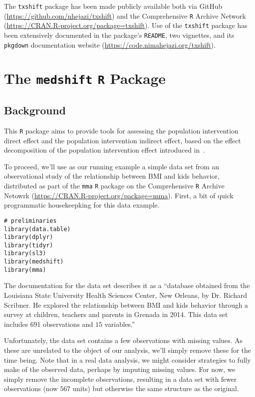 The \texttt{txshift} package has been made publicly available both via
GitHub (\url{https://github.com/nhejazi/txshift}) and the Comprehensive
\texttt{R} Archive Network (\url{https://CRAN.R-project.org/package=txshift}).
Use of the \texttt{txshift} package has been extensively documented in the
package's \texttt{README}, two vignettes, and its \texttt{pkgdown} documentation
website (\url{https://code.nimahejazi.org/txshift}).

\section{The \texttt{medshift} \texttt{R} Package}

\subsection{Background}

This \texttt{R} package aims to provide tools for assessing the population
intervention direct effect and the population intervention indirect effect,
based on the effect decomposition of the population intervention effect
introduced in~\citet{diaz2020causal}.

To proceed, we'll use as our running example a simple data set from an
observational study of the relationship between BMI and kids behavior,
distributed as part of the \texttt{mma} \texttt{R} package on the Comprehensive
\texttt{R} Archive Netowrk (\url{https://CRAN.R-project.org/package=mma}).
First, a bit of quick programmatic housekeepking for this data example.

\begin{lstlisting}
# preliminaries
library(data.table)
library(dplyr)
library(tidyr)
library(sl3)
library(medshift)
library(mma)
\end{lstlisting}

The documentation for the data set describes it as a ``database obtained from
the Louisiana State University Health Sciences Center, New Orleans, by  Dr.
Richard Scribner. He  explored the relationship  between BMI and kids behavior
through a survey at children, teachers and parents in Grenada in 2014. This data
set includes $691$ observations and $15$ variables.''

Unfortunately, the data set contains a few observations with missing values. As
these are unrelated to the object of our analysis, we'll simply remove these for
the time being. Note that in a real data analysis, we might consider strategies
to fully make of the observed data, perhaps by imputing missing values. For now,
we simply remove the incomplete observations, resulting in a data set with fewer
observations (now $567$ units) but otherwise the same structure as the original.

